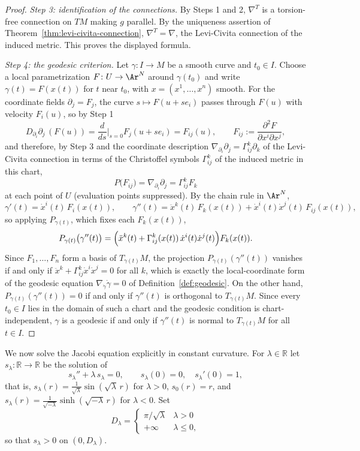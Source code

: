 \begin{proof}
\emph{Step 3: identification of the connections.} By Steps 1 and
2, $\nabla^T$ is a torsion-free connection on $TM$ making $g$
parallel. By the uniqueness assertion of
Theorem~\ref{thm:levi-civita-connection}, $\nabla^T=\nabla$, the
Levi-Civita connection of the induced metric. This proves the
displayed formula.

\emph{Step 4: the geodesic criterion.} Let $\gamma\colon I\to M$
be a smooth curve and $t_0\in I$. Choose a local parametrization
$F\colon U\to\Ar^N$ around $\gamma(t_0)$ and write
$\gamma(t)=F(x(t))$ for $t$ near $t_0$, with
$x=(x^1,\ldots,x^n)$ smooth. For the coordinate fields
$\partial_j=F_j$, the curve $s\mapsto F(u+se_i)$ passes through
$F(u)$ with velocity $F_i(u)$, so by Step 1
$$D_{\partial_i}\partial_j\,(F(u))
=\frac{d}{ds}\Big|_{s=0}F_j(u+se_i)=F_{ij}(u),\qquad
F_{ij}:=\frac{\partial^2F}{\partial x^i\partial x^j},$$
and therefore, by Step 3 and the coordinate description
$\nabla_{\partial_i}\partial_j=\Gamma^k_{ij}\partial_k$ of the
Levi-Civita connection in terms of the Christoffel symbols
$\Gamma^k_{ij}$ of the induced metric in this chart,
$$P\bigl(F_{ij}\bigr)=\nabla_{\partial_i}\partial_j
=\Gamma^k_{ij}F_k$$
at each point of $U$ (evaluation points suppressed). By the
chain rule in $\Ar^N$,
$$\gamma'(t)=\dot x^i(t)\,F_i(x(t)),\qquad
\gamma''(t)=\ddot x^k(t)\,F_k(x(t))
+\dot x^i(t)\dot x^j(t)\,F_{ij}(x(t)),$$
so applying $P_{\gamma(t)}$, which fixes each $F_k(x(t))$,
$$P_{\gamma(t)}\bigl(\gamma''(t)\bigr)
=\Bigl(\ddot x^k(t)+\Gamma^k_{ij}(x(t))\,
\dot x^i(t)\dot x^j(t)\Bigr)F_k(x(t)).$$
Since $F_1,\ldots,F_n$ form a basis of $T_{\gamma(t)}M$, the
projection $P_{\gamma(t)}(\gamma''(t))$ vanishes if and only if
$\ddot x^k+\Gamma^k_{ij}\dot x^i\dot x^j=0$ for all $k$, which is
exactly the local-coordinate form of the geodesic equation
$\nabla_{\dot\gamma}\dot\gamma=0$ of
Definition~\ref{def:geodesic}. On the other hand,
$P_{\gamma(t)}(\gamma''(t))=0$ if and only if $\gamma''(t)$ is
orthogonal to $T_{\gamma(t)}M$. Since every $t_0\in I$ lies in
the domain of such a chart and the geodesic condition is
chart-independent, $\gamma$ is a geodesic if and only if
$\gamma''(t)$ is normal to $T_{\gamma(t)}M$ for all $t\in I$.
\end{proof}

We now solve the Jacobi equation explicitly in constant curvature.
For $\lambda\in\mathbb{R}$ let $s_\lambda\colon
\mathbb{R}\to\mathbb{R}$ be the solution of
$$s_\lambda''+\lambda\, s_\lambda=0,\qquad s_\lambda(0)=0,\quad
s_\lambda'(0)=1,$$
that is, $s_\lambda(r)=\frac{1}{\sqrt\lambda}\sin(\sqrt\lambda\,r)$
for $\lambda>0$, $s_0(r)=r$, and
$s_\lambda(r)=\frac{1}{\sqrt{-\lambda}}\sinh(\sqrt{-\lambda}\,r)$
for $\lambda<0$. Set
$$D_\lambda=\begin{cases}\pi/\sqrt{\lambda}&\lambda>0\\
+\infty&\lambda\le 0,\end{cases}$$
so that $s_\lambda>0$ on $(0,D_\lambda)$.


